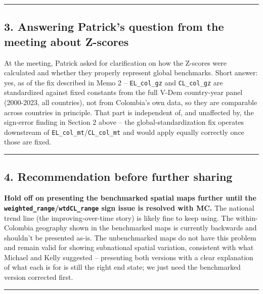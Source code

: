 \documentclass[
]{article}
\begin{document}
\begin{center}\rule{0.5\linewidth}{0.5pt}\end{center}

\hypertarget{answering-patricks-question-from-the-meeting-about-z-scores}{%
\subsection{3. Answering Patrick's question from the meeting about
Z-scores}\label{answering-patricks-question-from-the-meeting-about-z-scores}}

At the meeting, Patrick asked for clarification on how the Z-scores were
calculated and whether they properly represent global benchmarks. Short
answer: yes, as of the fix described in Memo 2 -- \texttt{EL\_col\_gz}
and \texttt{CL\_col\_gz} are standardized against fixed constants from
the full V-Dem country-year panel (2000-2023, all countries), not from
Colombia's own data, so they are comparable across countries in
principle. That part is independent of, and unaffected by, the
sign-error finding in Section 2 above -- the global-standardization fix
operates downstream of \texttt{EL\_col\_mt}/\texttt{CL\_col\_mt} and
would apply equally correctly once those are fixed.

\begin{center}\rule{0.5\linewidth}{0.5pt}\end{center}

\hypertarget{recommendation-before-further-sharing}{%
\subsection{4. Recommendation before further
sharing}\label{recommendation-before-further-sharing}}

\textbf{Hold off on presenting the benchmarked spatial maps further
until the \texttt{weighted\_range}/\texttt{wtdCL\_range} sign issue is
resolved with MC.} The national trend line (the improving-over-time
story) is likely fine to keep using. The within-Colombia geography shown
in the benchmarked maps is currently backwards and shouldn't be
presented as-is. The unbenchmarked maps do not have this problem and
remain valid for showing subnational spatial variation, consistent with
what Michael and Kelly suggested -- presenting both versions with a
clear explanation of what each is for is still the right end state; we
just need the benchmarked version corrected first.

\begin{center}\rule{0.5\linewidth}{0.5pt}\end{center}
\end{document}
